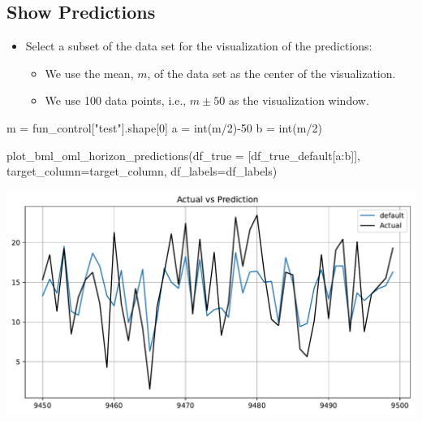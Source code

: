 \documentclass[
  letterpaper,
  DIV=11,
  numbers=noendperiod]{scrreprt}
\newenvironment{Shaded}{\begin{snugshade}}{\end{snugshade}}
\newcommand{\BuiltInTok}[1]{\textcolor[rgb]{0.00,0.23,0.31}{#1}}
\newcommand{\DecValTok}[1]{\textcolor[rgb]{0.68,0.00,0.00}{#1}}
\newcommand{\NormalTok}[1]{\textcolor[rgb]{0.00,0.23,0.31}{#1}}
\newcommand{\OperatorTok}[1]{\textcolor[rgb]{0.37,0.37,0.37}{#1}}
\newcommand{\StringTok}[1]{\textcolor[rgb]{0.13,0.47,0.30}{#1}}
\providecommand{\tightlist}{%
  \setlength{\itemsep}{0pt}\setlength{\parskip}{0pt}}\usepackage{longtable,booktabs,array}
\begin{document}
\subsection{Show Predictions}\label{show-predictions-1}

\begin{itemize}
\tightlist
\item
  Select a subset of the data set for the visualization of the
  predictions:

  \begin{itemize}
  \tightlist
  \item
    We use the mean, \(m\), of the data set as the center of the
    visualization.
  \item
    We use 100 data points, i.e., \(m \pm 50\) as the visualization
    window.
  \end{itemize}
\end{itemize}

\begin{Shaded}
\begin{Highlighting}[]
\NormalTok{m }\OperatorTok{=}\NormalTok{ fun\_control[}\StringTok{"test"}\NormalTok{].shape[}\DecValTok{0}\NormalTok{]}
\NormalTok{a }\OperatorTok{=} \BuiltInTok{int}\NormalTok{(m}\OperatorTok{/}\DecValTok{2}\NormalTok{)}\OperatorTok{{-}}\DecValTok{50}
\NormalTok{b }\OperatorTok{=} \BuiltInTok{int}\NormalTok{(m}\OperatorTok{/}\DecValTok{2}\NormalTok{)}
\end{Highlighting}
\end{Shaded}

\begin{Shaded}
\begin{Highlighting}[]
\NormalTok{plot\_bml\_oml\_horizon\_predictions(df\_true }\OperatorTok{=}\NormalTok{ [df\_true\_default[a:b]], target\_column}\OperatorTok{=}\NormalTok{target\_column,  df\_labels}\OperatorTok{=}\NormalTok{df\_labels)}
\end{Highlighting}
\end{Shaded}

\includegraphics{025_spot_hpt_river_friedman_amfr_files/figure-pdf/cell-30-output-1.pdf}
\end{document}
